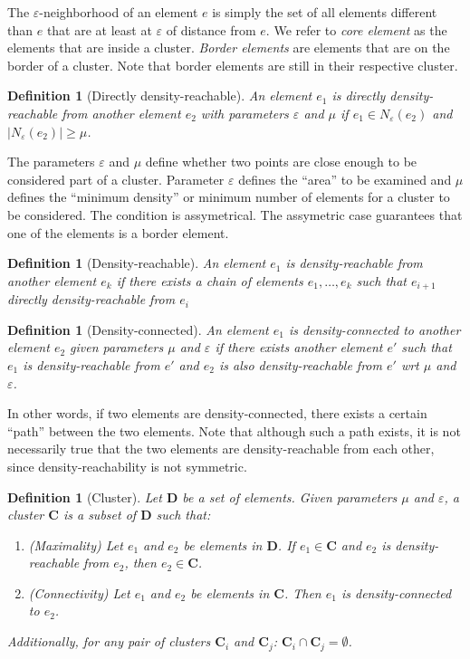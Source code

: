 \documentclass{amsart}
\theoremstyle{plain}
\newcounter{dummy-def}\numberwithin{dummy-def}{section}
\newtheorem{definition}[dummy-def]{Definition}
\newcounter{dummy-thm}\numberwithin{dummy-thm}{section}
\newcounter{dummy-prop}\numberwithin{dummy-prop}{section}
\newcounter{dummy-corollary}\numberwithin{dummy-corollary}{section}
\newcounter{dummy-lemma}\numberwithin{dummy-lemma}{section}
\newcounter{dummy-ex}\numberwithin{dummy-ex}{section}
\newcounter{dummy-eg}\numberwithin{dummy-eg}{section}
\numberwithin{equation}{section}
\newcommand{\set}[1]{\mathbf{#1}}
\newcommand{\eps}{\varepsilon}
\begin{document}
The $\eps$-neighborhood of an element $e$ is simply the set of all elements different than
$e$ that are at least at $\eps$ of distance from $e$. We refer to \textit{core element} as
the elements that are inside a cluster. \textit{Border elements} are elements that are on the
border of a cluster. Note that border elements are still in their respective cluster.

\begin{definition}[Directly density-reachable]
  An element $e_1$ is directly density-reachable from another element $e_2$ with parameters
  $\eps$ and $\mu$ if $e_1\in N_\eps(e_2)$ and $|N_\eps(e_2)|\geq\mu$.
\end{definition}

The parameters $\eps$ and $\mu$ define whether two points are close enough to be considered
part of a cluster. Parameter $\eps$ defines the ``area'' to be examined and $\mu$ defines
the ``minimum density'' or minimum number of elements for a cluster to be considered. The condition
is assymetrical. The assymetric case guarantees that one of the elements is a border element.

\begin{definition}[Density-reachable]
  An element $e_1$ is density-reachable from another element $e_k$ if there exists a chain of
  elements $e_1,\ldots,e_k$ such that $e_{i+1}$ directly density-reachable from $e_i$
\end{definition}

\begin{definition}[Density-connected]
  An element $e_1$ is density-connected to another element $e_2$ given parameters $\mu$ and
  $\eps$ if there exists another element $e'$ such that $e_1$ is density-reachable from $e'$ and
  $e_2$ is also density-reachable from $e'$ wrt $\mu$ and $\eps$.
\end{definition}

In other words, if two elements are density-connected, there exists a certain ``path'' between the
two elements. Note that although such a path exists, it is not necessarily true that the two
elements are density-reachable from each other, since density-reachability is not symmetric.

\begin{definition}[Cluster]
  Let $\set{D}$ be a set of elements. Given parameters $\mu$ and $\eps$, a cluster $\set{C}$ is a
  subset of $\set{D}$ such that:
  \begin{enumerate}[label=\roman*]
    \item (Maximality) Let $e_1$ and $e_2$ be elements in $\set{D}$. If $e_1\in\set{C}$ and $e_2$
      is density-reachable from $e_2$, then $e_2\in\set{C}$.
    \item (Connectivity) Let $e_1$ and $e_2$ be elements in $\set{C}$. Then $e_1$ is
      density-connected to $e_2$.
  \end{enumerate}
  Additionally, for any pair of clusters $\set{C}_i$ and $\set{C}_j$: $\set{C}_i\cap\set{C}_j=
  \emptyset$.
\end{definition}
\end{document}
